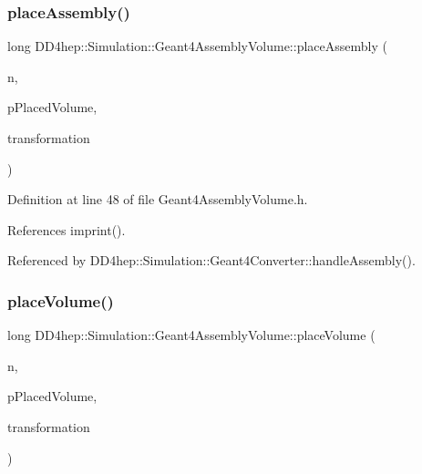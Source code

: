 \subsubsection{\texorpdfstring{place\+Assembly()}{placeAssembly()}}
{\footnotesize\ttfamily long D\+D4hep\+::\+Simulation\+::\+Geant4\+Assembly\+Volume\+::place\+Assembly (\begin{DoxyParamCaption}\item[{const T\+Geo\+Node $\ast$}]{n,  }\item[{\hyperlink{class_d_d4hep_1_1_simulation_1_1_geant4_assembly_volume}{Geant4\+Assembly\+Volume} $\ast$}]{p\+Placed\+Volume,  }\item[{G4\+Transform3D \&}]{transformation }\end{DoxyParamCaption})\hspace{0.3cm}{\ttfamily [inline]}}



Definition at line 48 of file Geant4\+Assembly\+Volume.\+h.



References imprint().



Referenced by D\+D4hep\+::\+Simulation\+::\+Geant4\+Converter\+::handle\+Assembly().

\hypertarget{class_d_d4hep_1_1_simulation_1_1_geant4_assembly_volume_a7ab45077a09ab1397f437b167b097c94}{}\label{class_d_d4hep_1_1_simulation_1_1_geant4_assembly_volume_a7ab45077a09ab1397f437b167b097c94} 
\subsubsection{\texorpdfstring{place\+Volume()}{placeVolume()}}
{\footnotesize\ttfamily long D\+D4hep\+::\+Simulation\+::\+Geant4\+Assembly\+Volume\+::place\+Volume (\begin{DoxyParamCaption}\item[{const T\+Geo\+Node $\ast$}]{n,  }\item[{G4\+Logical\+Volume $\ast$}]{p\+Placed\+Volume,  }\item[{G4\+Transform3D \&}]{transformation }\end{DoxyParamCaption})\hspace{0.3cm}{\ttfamily [inline]}}



